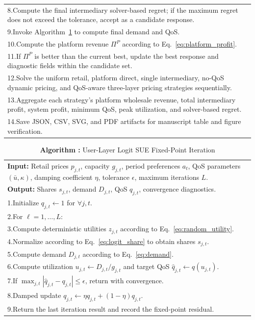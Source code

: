 \documentclass[11pt,a4paper]{article}
\newcounter{algobox}
\renewcommand{\thealgobox}{\arabic{algobox}}
\newcommand{\algcaption}[1]{\refstepcounter{algobox}\caption*{\textbf{Algorithm \thealgobox: }#1}}
\newcommand{\qos}{q}
\newcommand{\D}{D}
\begin{document}
\begin{table}[H]
\begin{tabular}{p{}}
8.\quad\quad Compute the final intermediary solver-based regret; if the maximum regret does not exceed the tolerance, accept as a candidate response.\\
9.\quad\quad Invoke Algorithm~\ref{alg:user_sue_fixpoint} to compute final demand and QoS.\\
10.\quad\quad Compute the platform revenue $\Pi^P$ according to Eq.~\eqref{eq:platform_profit}.\\
11.\quad\quad If $\Pi^P$ is better than the current best, update the best response and diagnostic fields within the candidate set.\\
12.\quad Solve the uniform retail, platform direct, single intermediary, no-QoS dynamic pricing, and QoS-aware three-layer pricing strategies sequentially.\\
13.\quad Aggregate each strategy's platform wholesale revenue, total intermediary profit, system profit, minimum QoS, peak utilization, and solver-based regret.\\
14.\quad Save JSON, CSV, SVG, and PDF artifacts for manuscript table and figure verification.\\
\bottomrule
\end{tabular}
\end{table}

\begin{table}[H]
\centering
\algcaption{User-Layer Logit SUE Fixed-Point Iteration}
\label{alg:user_sue_fixpoint}
\begin{tabular}{p{}}
\toprule
\textbf{Input:} Retail prices $p_{j,t}$, capacity $g_{j,t}$, period preferences $a_t$, QoS parameters $(\bar u,\kappa)$, damping coefficient $\eta$, tolerance $\epsilon$, maximum iterations $L$.\\
\textbf{Output:} Shares $s_{j,t}$, demand $\D_{j,t}$, QoS $q_{j,t}$, convergence diagnostics.\\
\midrule
1.\quad Initialize $q_{j,t}\leftarrow 1$ for $\forall j,t$.\\
2.\quad For $\ell=1,\ldots,L$:\\
3.\quad\quad Compute deterministic utilities $z_{j,t}$ according to Eq.~\eqref{eq:random_utility}.\\
4.\quad\quad Normalize according to Eq.~\eqref{eq:logit_share} to obtain shares $s_{j,t}$.\\
5.\quad\quad Compute demand $\D_{j,t}$ according to Eq.~\eqref{eq:demand}.\\
6.\quad\quad Compute utilization $u_{j,t}\leftarrow\D_{j,t}/g_{j,t}$ and target QoS $\hat q_{j,t}\leftarrow\qos(u_{j,t})$.\\
7.\quad\quad If $\max_{j,t}|\hat q_{j,t}-q_{j,t}|\le\epsilon$, return with convergence.\\
8.\quad\quad Damped update $q_{j,t}\leftarrow\eta\hat q_{j,t}+(1-\eta)q_{j,t}$.\\
9.\quad Return the last iteration result and record the fixed-point residual.\\
\bottomrule
\end{tabular}
\end{table}
\end{document}
